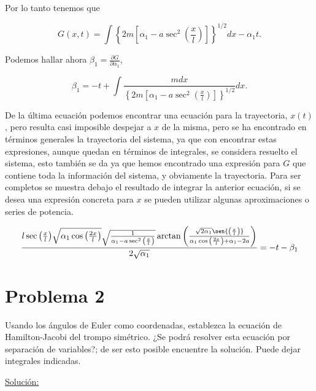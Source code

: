 \documentclass[a4paper,10pt]{article}
\numberwithin{equation}{section}
\begin{document}
Por lo tanto tenemos que 

\begin{equation}
 G(x,t) =  \int \left\{2m\left[\alpha_1 - a\sec^2{\left(\frac{x}{l}\right)}\right]\right\}^{1/2}dx
 - \alpha_1t.
\end{equation}

Podemos hallar ahora $\beta_1 = \frac{\partial G}{\partial \alpha_1}$, 

\begin{equation}
 \beta_1 = - t + \int \frac{mdx}{\left\{2m\left[\alpha_1 - a\sec^2{\left(\frac{x}{l}\right)}\right]\right\}^{1/2}}dx.
\end{equation}

De la última ecuación podemos encontrar una ecuación para la trayectoria, $x(t)$, pero 
resulta casi imposible despejar a $x$ de la misma, pero se ha encontrado en términos 
generales la trayectoria del sistema, ya que con encontrar estas expresiones, aunque 
quedan en términos de integrales, se considera resuelto el sistema, esto también 
se da ya que hemos encontrado una expresión para $G$ que contiene toda la información 
del sistema, y obviamente la trayectoria. Para ser completos se muestra debajo el 
resultado de integrar la anterior ecuación, si se desea una expresión 
concreta para $x$ se pueden utilizar algunas aproximaciones o series de potencia.

\begin{equation}
\frac{l\sec{\left(\frac{x}{l}\right)}\sqrt{\alpha_1\cos{\left(\frac{2x}{l}\right)}}
\sqrt{\frac{1}{\alpha_1 - a\sec^2{\left(\frac{x}{l}\right)}}}
\arctan{\left(\frac{\sqrt{2\alpha_1}\sen{\left(\frac{x}{l}\right)}}{\alpha_1\cos{\left(\frac{2x}{l}\right)+ \alpha_1 - 2a}}\right)}}{2\sqrt{\alpha_1}}
= - t - \beta_1
\end{equation}

\section{Problema 2}

Usando los ángulos de Euler como coordenadas, establezca la ecuación de Hamilton-Jacobi 
del trompo simétrico. ¿Se podrá resolver esta ecuación por separación de variables?; 
de ser esto posible encuentre la solución. Puede dejar integrales indicadas.

\vspace{.3cm}

\underline{Solución:} \vspace{.3cm}
\end{document}
